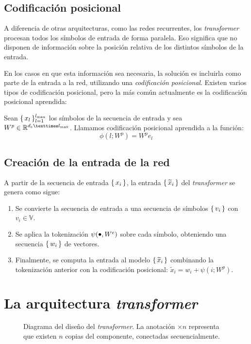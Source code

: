 \subsection{Codificación posicional}
A diferencia de otras arquitecturas, como las redes recurrentes, los \textit{transformer} procesan todos los símbolos de entrada de forma paralela. Eso significa que no disponen de información sobre la posición relativa de los distintos símbolos de la entrada. 

En los casos en que esta información sea necesaria, la solución es incluirla como parte de la entrada a la red, utilizando una \textit{codificación posicional}. Existen varios tipos de codificación posicional, pero la más común actualmente es la codificación posicional aprendida: 
\begin{definition}
    Sean \( \{\,x_l\,\}_{l = 1}^{l_\text{max}} \) los símbolos de la secuencia de entrada  y sea \( W^p \in \real{d_e × l_\text{max}} \). Llamamos codificación posicional aprendida a la función:
    \[
        \phi(l; W^p) = W^p e_l
    \]
\end{definition}

\subsection{Creación de la entrada de la red}
A partir de la secuencia de entrada \( \{\, x_i \,\} \), la entrada \( \{\, \widetilde{x}_i \,\} \) del \textit{transformer} se genera como sigue:
\begin{enumerate}
    \item Se convierte la secuencia de entrada a una secuencia de símbolos \( \{\, v_i \,\} \) con \( v_i \in \mathbb{V} \).
    \item Se aplica la tokenización \( \psi(\smallbullet, W^e) \) sobre cada símbolo, obteniendo una secuencia \( \{\, w_i \,\} \) de vectores.
    \item Finalmente, se computa la entrada al modelo \( \{\, \widetilde{x}_i \,\} \) combinando la tokenización anterior con la codificación posicional: \( \widetilde{x}_i = w_i + \psi(i; W^p) \).
\end{enumerate}

\section{La arquitectura \textit{transformer}}
\begin{figure}[tb]
    \centering
    
    \caption{Diagrama del diseño del \textit{transformer}. La anotación \( × n \) representa que existen \( n \) copias del componente, conectadas secuencialmente.}
    \label{fig:transformer}
\end{figure}

